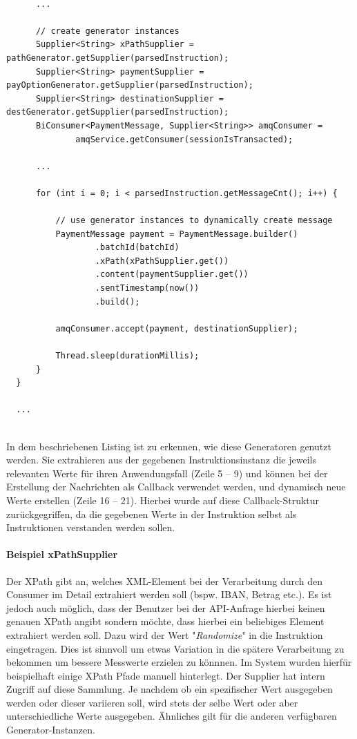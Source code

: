 \begin{lstlisting}[style=javaStyle,caption={Supplier - Service},label=lst:supplierServiceImpl]
  
      ...

      // create generator instances
      Supplier<String> xPathSupplier = pathGenerator.getSupplier(parsedInstruction);
      Supplier<String> paymentSupplier = payOptionGenerator.getSupplier(parsedInstruction);
      Supplier<String> destinationSupplier = destGenerator.getSupplier(parsedInstruction);
      BiConsumer<PaymentMessage, Supplier<String>> amqConsumer =
              amqService.getConsumer(sessionIsTransacted);

      ...

      for (int i = 0; i < parsedInstruction.getMessageCnt(); i++) {

          // use generator instances to dynamically create message
          PaymentMessage payment = PaymentMessage.builder()
                  .batchId(batchId)
                  .xPath(xPathSupplier.get())
                  .content(paymentSupplier.get())
                  .sentTimestamp(now())
                  .build();

          amqConsumer.accept(payment, destinationSupplier);

          Thread.sleep(durationMillis);
      }
  }

  ...
  
\end{lstlisting}

In dem beschriebenen Listing ist zu erkennen, wie diese Generatoren genutzt werden. Sie extrahieren aus der gegebenen Instruktionsinstanz die jeweils relevanten Werte für ihren Anwendungsfall (Zeile 5 -- 9) und können bei der Erstellung der Nachrichten als Callback verwendet werden, und dynamisch neue Werte erstellen (Zeile 16 -- 21). Hierbei wurde auf diese Callback-Struktur zurückgegriffen, da die gegebenen Werte in der Instruktion selbst als Instruktionen verstanden werden sollen.

\paragraph{Beispiel xPathSupplier} 
Der XPath gibt an, welches XML-Element bei der Verarbeitung durch den Consumer im Detail extrahiert werden soll (bspw. IBAN, Betrag etc.). Es ist jedoch auch möglich, dass der Benutzer bei der API-Anfrage hierbei keinen genauen XPath angibt sondern möchte, dass hierbei ein beliebiges Element extrahiert werden soll. Dazu wird der Wert "\emph{Randomize}" in die Instruktion eingetragen. Dies ist sinnvoll um etwas Variation in die spätere Verarbeitung zu bekommen um bessere Messwerte erzielen zu könnnen. Im System wurden hierfür beispielhaft einige XPath Pfade manuell hinterlegt. Der Supplier hat intern Zugriff auf diese Sammlung. Je nachdem ob ein spezifischer Wert ausgegeben werden oder dieser variieren soll, wird stets der selbe Wert oder aber unterschiedliche Werte ausgegeben. Ähnliches gilt für die anderen verfügbaren Generator-Instanzen.

